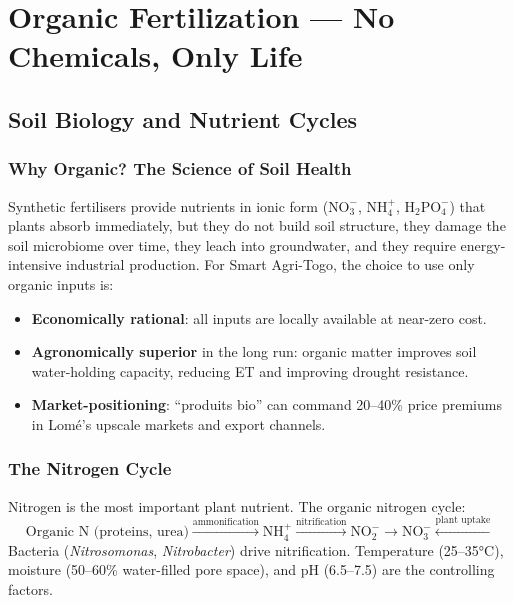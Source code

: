 \documentclass[12pt,a4paper,openany]{book}
\begin{document}
\part{Organic Fertilization — No Chemicals, Only Life}

\chapter{Soil Biology and Nutrient Cycles}
\label{chap:soil_bio}

\section{Why Organic? The Science of Soil Health}

Synthetic fertilisers provide nutrients in ionic form ($\text{NO}_3^-$, $\text{NH}_4^+$, $\text{H}_2\text{PO}_4^-$) that plants absorb immediately, but they do not build soil structure, they damage the soil microbiome over time, they leach into groundwater, and they require energy-intensive industrial production. For Smart Agri-Togo, the choice to use only organic inputs is:
\begin{itemize}[leftmargin=2em]
  \item \textbf{Economically rational}: all inputs are locally available at near-zero cost.
  \item \textbf{Agronomically superior} in the long run: organic matter improves soil water-holding capacity, reducing ET and improving drought resistance.
  \item \textbf{Market-positioning}: ``produits bio'' can command 20--40\% price premiums in Lomé's upscale markets and export channels.
\end{itemize}

\section{The Nitrogen Cycle}

Nitrogen is the most important plant nutrient. The organic nitrogen cycle:
\[
\text{Organic N (proteins, urea)} \xrightarrow{\text{ammonification}} \text{NH}_4^+ \xrightarrow{\text{nitrification}} \text{NO}_2^- \to \text{NO}_3^- \xleftarrow{\text{plant uptake}}
\]
Bacteria (\textit{Nitrosomonas}, \textit{Nitrobacter}) drive nitrification. Temperature (25--35°C), moisture (50--60\% water-filled pore space), and pH (6.5--7.5) are the controlling factors.
\end{document}
